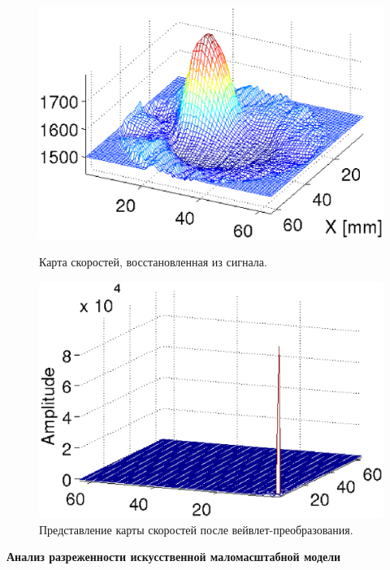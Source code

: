 \documentclass[14pt]{matmex-diploma}
\begin{document}
\begin{figure}[!tbp]
    \centering
    \begin{minipage}[b]{0.45\textwidth}
        \includegraphics[width=\textwidth]{pics_eps/speed_map.eps}
        \caption{\small Карта скоростей, восстановленная из сигнала.}
        \label{fig:speedmap}
    \end{minipage}
    \hfill
    \begin{minipage}[b]{0.45\textwidth}
        \includegraphics[width=\textwidth]{pics_eps/freq_domain.eps}
        \caption{\small Представление карты скоростей после вейвлет-преобразования.}
        \label{fig:waveletted}
    \end{minipage}
\end{figure}

\textbf{Анализ разреженности искусственной маломасштабной модели}\\
\end{document}
